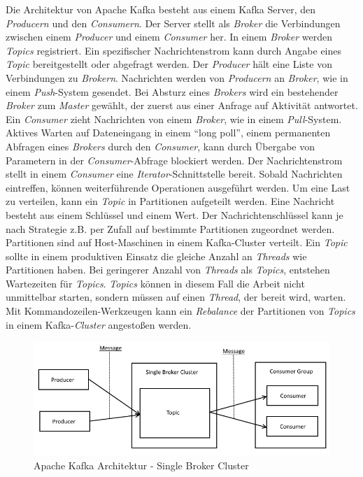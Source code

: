 Die Architektur von Apache Kafka besteht aus einem Kafka Server, den \textit{Producern} und den \textit{Consumern}. Der Server stellt als \textit{Broker} die Verbindungen zwischen einem \textit{Producer} und einem \textit{Consumer} her. In einem \textit{Broker} werden \textit{Topics} registriert. Ein spezifischer Nachrichtenstrom kann durch Angabe eines \textit{Topic} bereitgestellt oder abgefragt werden. Der \textit{Producer} hält eine Liste von Verbindungen zu \textit{Brokern}. Nachrichten werden von \textit{Producern} an \textit{Broker}, wie in einem \textit{Push}-System gesendet. Bei Absturz eines \textit{Brokers} wird ein bestehender \textit{Broker} zum \textit{Master} gewählt, der zuerst aus einer Anfrage auf Aktivität antwortet. Ein \textit{Consumer} zieht Nachrichten von einem \textit{Broker}, wie in einem \textit{Pull}-System. Aktives Warten auf Dateneingang in einem "`long poll"', einem permanenten Abfragen eines \textit{Brokers} durch den \textit{Consumer}, kann durch Übergabe von Parametern in der \textit{Consumer}-Abfrage blockiert werden. Der Nachrichtenstrom stellt in einem \textit{Consumer} eine \textit{Iterator}-Schnittstelle bereit. Sobald Nachrichten eintreffen, können weiterführende Operationen ausgeführt werden. Um eine Last zu verteilen, kann ein \textit{Topic} in Partitionen aufgeteilt werden. Eine Nachricht besteht aus einem Schlüssel und einem Wert. Der Nachrichtenschlüssel kann je nach Strategie z.B. per Zufall auf bestimmte Partitionen zugeordnet werden. Partitionen sind auf Host-Maschinen in  einem Kafka-Cluster verteilt. Ein \textit{Topic} sollte in einem produktiven Einsatz die gleiche Anzahl an \textit{Threads} wie Partitionen haben. Bei geringerer Anzahl von \textit{Threads} als \textit{Topics}, entstehen Wartezeiten für \textit{Topics}. \textit{Topics} können in diesem Fall die Arbeit nicht unmittelbar starten, sondern müssen auf einen \textit{Thread}, der bereit wird, warten. Mit Kommandozeilen-Werkzeugen kann ein \textit{Rebalance} der Partitionen von \textit{Topics} in einem Kafka-\textit{Cluster} angestoßen werden. 

\begin{figure}[htb!]
\centering
\includegraphics[width=1.0\textwidth]{bilder/kafkaDesign.png}
\caption{Apache Kafka Architektur - Single Broker Cluster
\label{fig:kafkaDesign}}
\end{figure}

